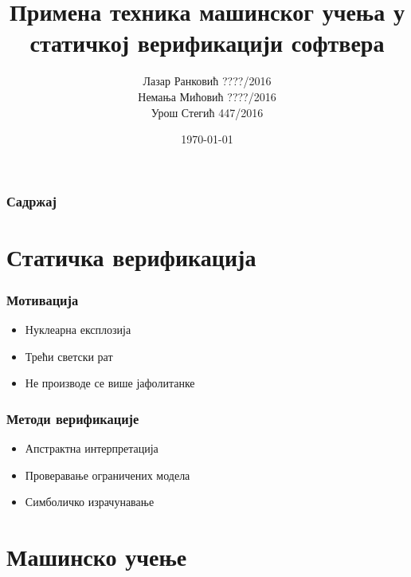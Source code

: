 \documentclass{beamer}
\title[Семинарски МСНР]{Примена техника машинског учења у статичкој верификацији софтвера}
\author{	Лазар Ранковић ????/2016 \\
		Немања Мићовић ????/2016 \\
		Урош Стегић 447/2016
}
\institute[МАТФ]{Математички факултет}
\date{\today}
\begin{document}
\begin{frame}
\titlepage
\end{frame}

\begin{frame}
\frametitle{Садржај}
\tableofcontents
\end{frame}




\section{Статичка верификација}

\begin{frame}
\frametitle{Мотивација}
\begin{itemize}
	\item Нуклеарна експлозија
	\item Трећи светски рат
	\item Не производе се више јафолитанке
\end{itemize}
\end{frame}
\begin{frame}
\frametitle{Методи верификације}
\begin{itemize}
	\item Апстрактна интерпретација
 	\item Проверавање ограничених модела
 	\item Симболичко израчунавање
\end{itemize}
\end{frame}



\section{Машинско учење}
\end{document}
